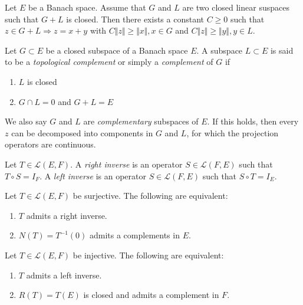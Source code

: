 \begin{thm}
Let $E$ be a Banach space. Assume that $G$ and $L$ are two closed linear suspaces such that $G+L$ is closed. Then there exists a constant $C \geq 0$ such that $z \in G+L \Rightarrow z = x + y$ with $ C \Vert z \Vert \geq \Vert x \Vert, x \in G$ and $ C \Vert z \Vert \geq \Vert y \Vert, y \in L$.

\end{thm}

\begin{defn}
Let $G \subset E$ be a closed subspace of a Banach space $E$. A subspace $L \subset E$ is said to be a \textit{topological complement} or simply a \textit{complement} of $G$ if
\begin{enumerate}
	\item $L$ is closed
	\item $ G \cap L = 0$ and $G+L = E$
\end{enumerate}
We also say $G$ and $L$ are \textit{complementary} subspaces of $E$. If this holds, then every $z$ can be decomposed into components in $G$ and $L$, for which the projection operators are continuous.
\end{defn}

\begin{defn}
	Let $T \in \mathcal{L}(E,F)$. A \textit{right inverse} is an operator $S \in \mathcal{L}(F,E)$ such that $ T \circ S = I_F$. A \textit{left inverse} is an operator $S \in \mathcal{L}(F,E)$ such that $S \circ T = I_E$.
\end{defn}

\begin{thm}
	Let $T \in \mathcal{L}(E,F)$ be surjective. The following are equivalent:
	\begin{enumerate}
		\item $T$ admits a right inverse.
		\item $N(T) = T^{-1}(0)$ admits a complements in $E$.
	\end{enumerate}
\end{thm}

\begin{thm}
	Let $T \in \mathcal{L}(E,F)$ be injective. The following are equivalent:
	\begin{enumerate}
		\item $T$ admits a left inverse.
		\item $R(T) = T(E)$ is closed and admits a complement in $F$.
	\end{enumerate}
\end{thm}

